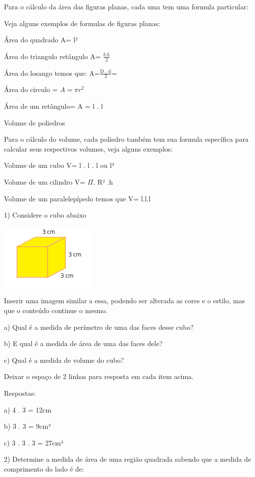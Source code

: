 {Para o cálculo da área das figuras planas, cada uma tem uma formula
particular:

Veja alguns exemplos de formulas de figuras planas:

Área do quadrado A= l²

Área do triangulo retângulo A= \(\frac{b.h}{2}\)

Área do losango temos que: A=\(\frac{\text{D\ .\ d}}{2}\)=

Área do circulo = \(A = \pi r^{2}\)

Área de um retângulo= A = l . l

Volume de poliedros

Para o cálculo do volume, cada poliedro também tem sua formula
específica para calcular seus respectivos volumes, veja alguns exemplos:

Volume de um cubo V= l . l . l ou l³

Volume de um cilindro V= \(\Pi\). R² .h

Volume de um paralelepípedo temos que V= l.l.l


1) Considere o cubo abaixo

\includegraphics[width=1.89583in,height=1.27083in]{./imgSAEB_8_MAT/media/image42.png}

Inserir uma imagem similar a essa, podendo ser alterada as cores e o
estilo, mas que o conteúdo continue o mesmo.

a) Qual é a medida de perímetro de uma das faces desse cubo?

b) E qual é a medida de área de uma das faces dele?

c) Qual é a medida de volume do cubo?

Deixar o espaço de 2 linhas para resposta em cada item acima.

Respostas:

a) 4 . 3 = 12cm

b) 3 . 3 = 9cm²

c) 3 . 3 . 3 = 27cm³

2) Determine a medida de área de uma região quadrada sabendo que a
medida de comprimento do lado é de:

}
